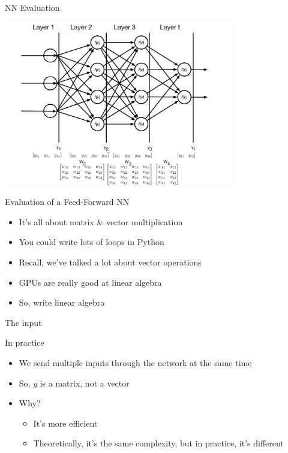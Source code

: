 \documentclass[aspectratio=169]{beamer}
\begin{document}
\begin{frame}{NN Evaluation}

\includegraphics[width=0.75\textwidth]{lectFF/nnEval.pdf}
\end{frame}
\begin{frame}{Evaluation of a Feed-Forward NN}

\begin{itemize}
        \item It's all about matrix \& vector multiplication
        \item You could write lots of loops in Python
        \item Recall, we've talked a lot about vector operations
        \item GPUs are really good at linear algebra
        \item So, write linear algebra
\end{itemize}
\end{frame}
\begin{frame}{The input}

In practice
\begin{itemize}
        \item We send multiple inputs through the network at the same time
        \item So, $y$ is a matrix, not a vector
        \item Why?
        \begin{itemize}
        		\item It's more efficient
		\item Theoretically, it's the same complexity, but in practice, it's different
	\end{itemize}

\end{itemize}
\end{frame}
\end{document}
